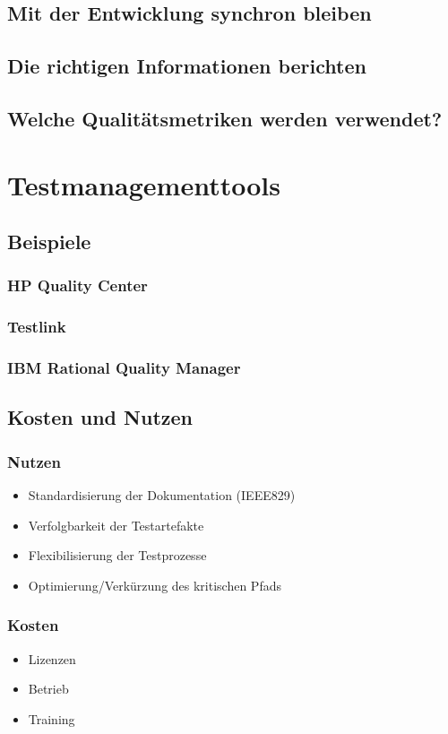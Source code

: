 \section{Mit der Entwicklung synchron bleiben}


\section{Die richtigen Informationen berichten}
\section{Welche Qualit\"atsmetriken werden verwendet?}

\chapter{Testmanagementtools}
\section{Beispiele}
\subsection{HP Quality Center}
\subsection{Testlink}
\subsection{IBM Rational Quality Manager}
\section{Kosten und Nutzen}
\subsection{Nutzen}
\begin{itemize}
	\item Standardisierung der Dokumentation (IEEE829)
	\item Verfolgbarkeit der Testartefakte
	\item Flexibilisierung der Testprozesse
	\item Optimierung/Verkürzung des kritischen Pfads
\end{itemize}
\subsection{Kosten}
\begin{itemize}
	\item Lizenzen
	\item Betrieb
	\item Training
\end{itemize}

